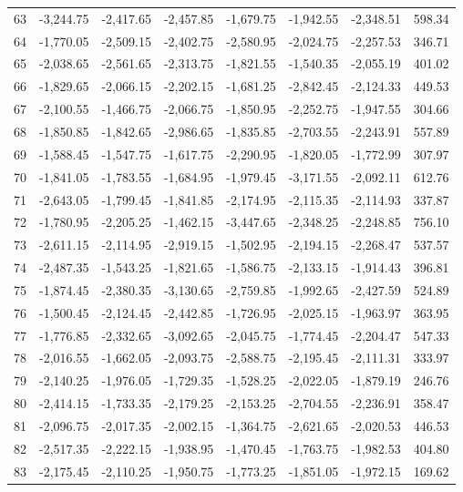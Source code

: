 \begin{longtable}{rrrrrrrr}
63 & -3,244.75 & -2,417.65 & -2,457.85 & -1,679.75 & -1,942.55 & -2,348.51 & 598.34  \\
64 & -1,770.05 & -2,509.15 & -2,402.75 & -2,580.95 & -2,024.75 & -2,257.53 & 346.71  \\
65 & -2,038.65 & -2,561.65 & -2,313.75 & -1,821.55 & -1,540.35 & -2,055.19 & 401.02  \\
66 & -1,829.65 & -2,066.15 & -2,202.15 & -1,681.25 & -2,842.45 & -2,124.33 & 449.53  \\
67 & -2,100.55 & -1,466.75 & -2,066.75 & -1,850.95 & -2,252.75 & -1,947.55 & 304.66  \\
68 & -1,850.85 & -1,842.65 & -2,986.65 & -1,835.85 & -2,703.55 & -2,243.91 & 557.89  \\
69 & -1,588.45 & -1,547.75 & -1,617.75 & -2,290.95 & -1,820.05 & -1,772.99 & 307.97  \\
70 & -1,841.05 & -1,783.55 & -1,684.95 & -1,979.45 & -3,171.55 & -2,092.11 & 612.76  \\
71 & -2,643.05 & -1,799.45 & -1,841.85 & -2,174.95 & -2,115.35 & -2,114.93 & 337.87  \\
72 & -1,780.95 & -2,205.25 & -1,462.15 & -3,447.65 & -2,348.25 & -2,248.85 & 756.10  \\
73 & -2,611.15 & -2,114.95 & -2,919.15 & -1,502.95 & -2,194.15 & -2,268.47 & 537.57  \\
74 & -2,487.35 & -1,543.25 & -1,821.65 & -1,586.75 & -2,133.15 & -1,914.43 & 396.81  \\
75 & -1,874.45 & -2,380.35 & -3,130.65 & -2,759.85 & -1,992.65 & -2,427.59 & 524.89  \\
76 & -1,500.45 & -2,124.45 & -2,442.85 & -1,726.95 & -2,025.15 & -1,963.97 & 363.95  \\
77 & -1,776.85 & -2,332.65 & -3,092.65 & -2,045.75 & -1,774.45 & -2,204.47 & 547.33  \\
78 & -2,016.55 & -1,662.05 & -2,093.75 & -2,588.75 & -2,195.45 & -2,111.31 & 333.97  \\
79 & -2,140.25 & -1,976.05 & -1,729.35 & -1,528.25 & -2,022.05 & -1,879.19 & 246.76  \\
80 & -2,414.15 & -1,733.35 & -2,179.25 & -2,153.25 & -2,704.55 & -2,236.91 & 358.47  \\
81 & -2,096.75 & -2,017.35 & -2,002.15 & -1,364.75 & -2,621.65 & -2,020.53 & 446.53  \\
82 & -2,517.35 & -2,222.15 & -1,938.95 & -1,470.45 & -1,763.75 & -1,982.53 & 404.80  \\
83 & -2,175.45 & -2,110.25 & -1,950.75 & -1,773.25 & -1,851.05 & -1,972.15 & 169.62  \\

\end{longtable}
